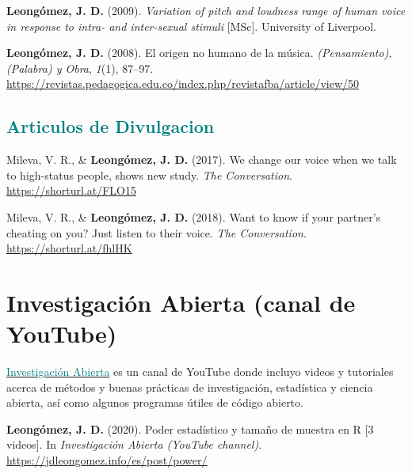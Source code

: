 \documentclass[11pt, a4paper]{awesome-cv}
\begin{document}
\leavevmode\hypertarget{ref-Leongomez2009}{}%
\textbf{Leongómez, J. D.} (2009). \emph{{Variation of pitch and loudness
range of human voice in response to intra- and inter-sexual stimuli}}
{[}MSc{]}. University of Liverpool.

\leavevmode\hypertarget{ref-Leongomez2008}{}%
\textbf{Leongómez, J. D.} (2008). {El origen no humano de la m{ú}sica}.
\emph{(Pensamiento), (Palabra) y Obra}, \emph{1}(1), 87--97.
\url{https://revistas.pedagogica.edu.co/index.php/revistafba/article/view/50}

\endgroup

\hypertarget{section-2}{%
\subsection{\texorpdfstring{\textcolor{teal}{Articulos de Divulgacion}}{}}\label{section-2}}

\begingroup
\setlength{\parindent}{-0.5in}
\setlength{\leftskip}{0.5in}

\hypertarget{refs_divulgation}{}
\leavevmode\hypertarget{ref-Mileva2017}{}%
Mileva, V. R., \& \textbf{Leongómez, J. D.} (2017). {We change our voice
when we talk to high-status people, shows new study}. \emph{The
Conversation}. \url{https://shorturl.at/FLO15}

\leavevmode\hypertarget{ref-Mileva2018}{}%
Mileva, V. R., \& \textbf{Leongómez, J. D.} (2018). {Want to know if
your partner's cheating on you? Just listen to their voice}. \emph{The
Conversation}. \url{https://shorturl.at/fhlHK}

\endgroup

\hypertarget{investigaciuxf3n-abierta-canal-de-youtube}{%
\section{Investigación Abierta (canal de
YouTube)}\label{investigaciuxf3n-abierta-canal-de-youtube}}

\href{https://www.youtube.com/user/juanleongomez/featured}{\textcolor{teal}{Investigación Abierta}}
es un canal de YouTube donde incluyo videos y tutoriales acerca de
métodos y buenas prácticas de investigación, estadística y ciencia
abierta, así como algunos programas útiles de código abierto.

\begingroup
\setlength{\parindent}{-0.5in}
\setlength{\leftskip}{0.5in}

\hypertarget{refs_IA}{}
\leavevmode\hypertarget{ref-leongomezPower2020}{}%
\textbf{Leongómez, J. D.} (2020). {Poder estadístico y tamaño de muestra
en R {[}3 videos{]}}. In \emph{{Investigación Abierta (YouTube
channel)}}. \url{https://jdleongomez.info/es/post/power/}
\end{document}
